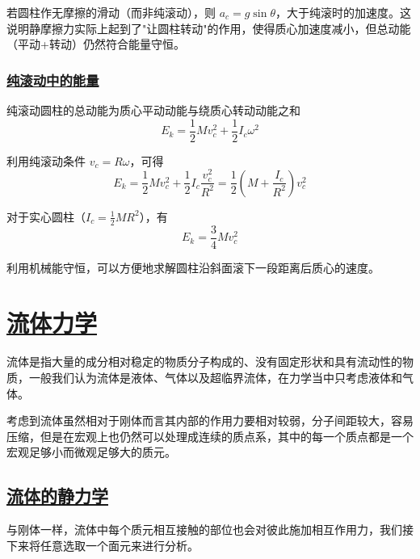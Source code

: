\begin{remark}
    若圆柱作无摩擦的滑动（而非纯滚动），则 $a_c = g\sin\theta$，大于纯滚时的加速度。这说明静摩擦力实际上起到了"让圆柱转动"的作用，使得质心加速度减小，但总动能（平动+转动）仍然符合能量守恒。
\end{remark}

\subsubsection{\protect\hyperlink{:}{纯滚动中的能量}}

纯滚动圆柱的总动能为质心平动动能与绕质心转动动能之和
\begin{equation}
    E_k = \frac{1}{2}Mv_c^2 + \frac{1}{2}I_c\omega^2
\end{equation}

利用纯滚动条件 $v_c = R\omega$，可得
\begin{equation}
    E_k = \frac{1}{2}Mv_c^2 + \frac{1}{2}I_c\frac{v_c^2}{R^2} = \frac{1}{2}\left(M + \frac{I_c}{R^2}\right)v_c^2
\end{equation}

对于实心圆柱（$I_c = \frac{1}{2}MR^2$），有
\begin{equation}
    E_k = \frac{3}{4}Mv_c^2
\end{equation}

利用机械能守恒，可以方便地求解圆柱沿斜面滚下一段距离后质心的速度。


\newpage
\section{\protect\hyperlink{:}{流体力学}}

\begin{definition}[流体]
    流体是指大量的成分相对稳定的物质分子构成的、没有固定形状和具有流动性的物质，一般我们认为流体是液体、气体以及超临界流体，在力学当中只考虑液体和气体。
\end{definition}

考虑到流体虽然相对于刚体而言其内部的作用力要相对较弱，分子间距较大，容易压缩，但是在宏观上也仍然可以处理成连续的质点系，其中的每一个质点都是一个宏观足够小而微观足够大的质元。



\subsection{\protect\hyperlink{:}{流体的静力学}}
与刚体一样，流体中每个质元相互接触的部位也会对彼此施加相互作用力，我们接下来将任意选取一个面元来进行分析。

